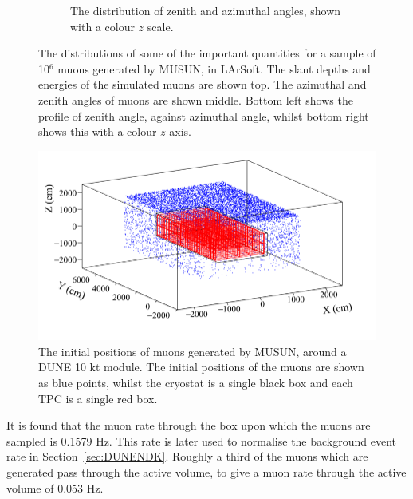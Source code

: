\begin{figure}[h!]
\begin{subfigure}{0.45\textwidth}
    \caption{The distribution of zenith and azimuthal angles, shown with a colour $z$ scale.}
  \end{subfigure}
  \caption[The distributions of some of the important quantities for a sample of 10$^6$ muons generated by MUSUN, in LArSoft]
          {The distributions of some of the important quantities for a sample of 10$^6$ muons generated by MUSUN, in LArSoft. The slant depths and energies of the simulated muons are shown top. The azimuthal and zenith angles of muons are shown middle. Bottom left shows the profile of zenith angle, against azimuthal angle, whilst bottom right shows this with a colour $z$ axis.}
  \label{fig:MUSUNIncorp}
\end{figure}

\begin{figure}[h!]
  \centering
  \includegraphics[width=\textwidth]{MuonPosCan}
  \caption[The initial positions of muons generated by MUSUN, around a DUNE 10 kt module]
          {The initial positions of muons generated by MUSUN, around a DUNE 10 kt module. The initial positions of the muons are shown as blue points, whilst the cryostat is a single black box and each TPC is a single red box.}
  \label{fig:10ktPos}
\end{figure}

It is found that the muon rate through the box upon which the muons are sampled is 0.1579 Hz. This rate is later used to normalise the background event rate in Section~\ref{sec:DUNENDK}. Roughly a third of the muons which are generated pass through the active volume, to give a muon rate through the active volume of 0.053 Hz. \\ 

